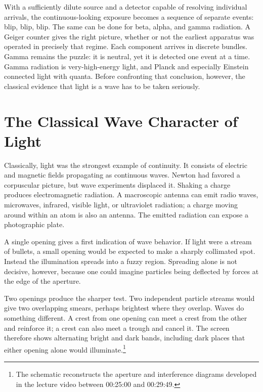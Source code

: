 With a sufficiently dilute source and a detector capable of resolving individual arrivals, the continuous-looking exposure becomes a sequence of separate events: blip, blip, blip. The same can be done for beta, alpha, and gamma radiation. A Geiger counter gives the right picture, whether or not the earliest apparatus was operated in precisely that regime. Each component arrives in discrete bundles. Gamma remains the puzzle: it is neutral, yet it is detected one event at a time. Gamma radiation is very-high-energy light, and Planck and especially Einstein connected light with quanta. Before confronting that conclusion, however, the classical evidence that light is a wave has to be taken seriously.

\section{The Classical Wave Character of Light}

Classically, light was the strongest example of continuity. It consists of electric and magnetic fields propagating as continuous waves. Newton had favored a corpuscular picture, but wave experiments displaced it. Shaking a charge produces electromagnetic radiation. A macroscopic antenna can emit radio waves, microwaves, infrared, visible light, or ultraviolet radiation; a charge moving around within an atom is also an antenna. The emitted radiation can expose a photographic plate.

A single opening gives a first indication of wave behavior. If light were a stream of bullets, a small opening would be expected to make a sharply collimated spot. Instead the illumination spreads into a fuzzy region. Spreading alone is not decisive, however, because one could imagine particles being deflected by forces at the edge of the aperture.

Two openings produce the sharper test. Two independent particle streams would give two overlapping smears, perhaps brightest where they overlap. Waves do something different. A crest from one opening can meet a crest from the other and reinforce it; a crest can also meet a trough and cancel it. The screen therefore shows alternating bright and dark bands, including dark places that either opening alone would illuminate.\footnote{The schematic reconstructs the aperture and interference diagrams developed in the lecture video between 00:25:00 and 00:29:49.}

